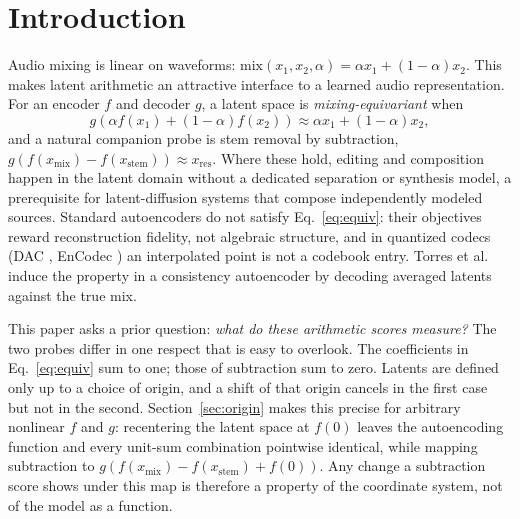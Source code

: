 \documentclass[conference]{IEEEtran}
\newcommand{\secref}[1]{Section~\ref{#1}}
\begin{document}
\section{Introduction}\label{sec:intro}
Audio mixing is linear on waveforms:
$\mathrm{mix}(x_1,x_2,\alpha)=\alpha x_1+(1{-}\alpha)x_2$. This makes latent
arithmetic an attractive interface to a learned audio representation. For an
encoder $f$ and decoder $g$, a latent space is \emph{mixing-equivariant} when
\begin{equation}
  g\!\left(\alpha f(x_1)+(1{-}\alpha)f(x_2)\right)\approx \alpha x_1+(1{-}\alpha)x_2 ,
  \label{eq:equiv}
\end{equation}
and a natural companion probe is stem removal by subtraction,
$g(f(x_\mathrm{mix}){-}f(x_\mathrm{stem}))\approx x_\mathrm{res}$. Where these
hold, editing and composition happen in the latent domain without a
dedicated separation or synthesis model, a prerequisite for latent-diffusion
systems \cite{liu2023audioldm,evans2024stable} that compose independently
modeled sources. Standard autoencoders do not satisfy Eq.~\ref{eq:equiv}:
their objectives reward reconstruction fidelity, not algebraic structure, and in quantized codecs (DAC \cite{kumar2024dac}, EnCodec
\cite{defossez2023encodec}) an interpolated point is not a codebook entry. Torres et al.~\cite{torres2026linearity} induce the property in a
consistency autoencoder by decoding averaged latents against the true mix.

This paper asks a prior question: \emph{what do these arithmetic scores
measure?} The two probes differ in one respect that is easy to overlook. The
coefficients in Eq.~\ref{eq:equiv} sum to one; those of subtraction sum to
zero. Latents are defined only up to a choice of origin, and a shift of that
origin cancels in the first case but not in the second. \secref{sec:origin}
makes this precise for arbitrary nonlinear $f$ and $g$: recentering the latent
space at $f(0)$ leaves the autoencoding function and every unit-sum
combination pointwise identical, while mapping subtraction to
$g(f(x_\mathrm{mix}){-}f(x_\mathrm{stem}){+}f(0))$. Any change a subtraction
score shows under this map is therefore a property of the coordinate system,
not of the model as a function.
\end{document}

